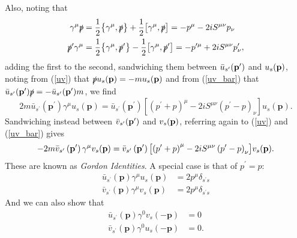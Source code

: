 Also, noting that
\begin{equation}
    \begin{aligned}
        \gamma^\mu\slashed{p}&=\frac{1}{2}\pb{\gamma^\mu}{\slashed{p}}+\frac{1}{2}\comm{\gamma^\mu}{\slashed{p}}=-p^\mu-2iS^{\mu\nu}p_\nu\\
        \slashed{p}^\prime\gamma^\mu&=\frac{1}{2}\pb{\gamma^\mu}{\slashed{p}^\prime}-\frac{1}{2}\comm{\gamma^\mu}{\slashed{p}^\prime}=-p^{\prime\mu}+2iS^{\mu\nu}p^\prime_\nu,
    \end{aligned}
\end{equation}
adding the first to the second, sandwiching them between $\bar{u}_{s^\prime}(\vb{p}^\prime)$ and $u_s(\vb{p})$, noting from (\ref{uv}) that $\slashed{p}u_s(\vb{p})=-mu_s(\vb{p})$ and from (\ref{uv_bar}) that $\bar{u}_{s^\prime}(\vb{p}^\prime)\slashed{p}=-\bar{u}_{s^\prime}(\vb{p}^\prime)m$, we find
\begin{equation}
2 m \bar{u}_{s^{\prime}}\left(\mathbf{p}^{\prime}\right) \gamma^{\mu} u_{s}(\mathbf{p})=\bar{u}_{s^{\prime}}\left(\mathbf{p}^{\prime}\right)\left[\left(p^{\prime}+p\right)^{\mu}-2 i S^{\mu \nu}\left(p^{\prime}-p\right)_{\nu}\right] u_{s}(\mathbf{p}).
\end{equation}
Sandwiching instead between $\bar{v}_{s^\prime}(\vb{p}^\prime)$ and $v_s(\vb{p})$, referring again to (\ref{uv}) and (\ref{uv_bar}) gives
\begin{equation}
-2 m \bar{v}_{s^{\prime}}\left(\mathbf{p}^{\prime}\right) \gamma^{\mu} v_{s}(\mathbf{p})=\bar{v}_{s^{\prime}}\left(\mathbf{p}^{\prime}\right)\qty[\left(p^{\prime}+p\right)^{\mu}-2 i S^{\mu \nu}\left(p^{\prime}-p\right)_{\nu}] v_{s}(\mathbf{p}).
\end{equation}
These are known as \textit{Gordon Identities}. A special case is that of $p^\prime=p$:
\begin{equation}
\begin{aligned}
\bar{u}_{s^{\prime}}(\mathbf{p}) \gamma^{\mu} u_{s}(\mathbf{p})&=2 p^{\mu} \delta_{s^{\prime} s} \\
\bar{v}_{s^{\prime}}(\mathbf{p}) \gamma^{\mu} v_{s}(\mathbf{p})&=2 p^{\mu} \delta_{s^{\prime} s}
\end{aligned}
\label{special_gordon_id}
\end{equation}
And we can also show \cite{srednicki2007quantum} that
\begin{equation}
\begin{aligned}
\bar{u}_{s^{\prime}}(\mathbf{p}) \gamma^{0} v_{s}(-\mathbf{p})&=0 \\
\bar{v}_{s^{\prime}}(\mathbf{p}) \gamma^{0} u_{s}(-\mathbf{p})&=0.
\end{aligned}
\label{special_gordon_id_negative}
\end{equation}

